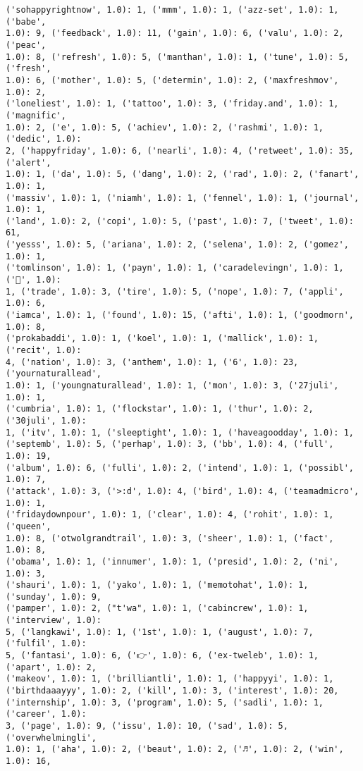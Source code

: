 \documentclass[11pt]{article}
\begin{document}
\begin{Verbatim}[commandchars=\\\{\}]
('sohappyrightnow', 1.0): 1, ('mmm', 1.0): 1, ('azz-set', 1.0): 1, ('babe',
1.0): 9, ('feedback', 1.0): 11, ('gain', 1.0): 6, ('valu', 1.0): 2, ('peac',
1.0): 8, ('refresh', 1.0): 5, ('manthan', 1.0): 1, ('tune', 1.0): 5, ('fresh',
1.0): 6, ('mother', 1.0): 5, ('determin', 1.0): 2, ('maxfreshmov', 1.0): 2,
('loneliest', 1.0): 1, ('tattoo', 1.0): 3, ('friday.and', 1.0): 1, ('magnific',
1.0): 2, ('e', 1.0): 5, ('achiev', 1.0): 2, ('rashmi', 1.0): 1, ('dedic', 1.0):
2, ('happyfriday', 1.0): 6, ('nearli', 1.0): 4, ('retweet', 1.0): 35, ('alert',
1.0): 1, ('da', 1.0): 5, ('dang', 1.0): 2, ('rad', 1.0): 2, ('fanart', 1.0): 1,
('massiv', 1.0): 1, ('niamh', 1.0): 1, ('fennel', 1.0): 1, ('journal', 1.0): 1,
('land', 1.0): 2, ('copi', 1.0): 5, ('past', 1.0): 7, ('tweet', 1.0): 61,
('yesss', 1.0): 5, ('ariana', 1.0): 2, ('selena', 1.0): 2, ('gomez', 1.0): 1,
('tomlinson', 1.0): 1, ('payn', 1.0): 1, ('caradelevingn', 1.0): 1, ('🌷', 1.0):
1, ('trade', 1.0): 3, ('tire', 1.0): 5, ('nope', 1.0): 7, ('appli', 1.0): 6,
('iamca', 1.0): 1, ('found', 1.0): 15, ('afti', 1.0): 1, ('goodmorn', 1.0): 8,
('prokabaddi', 1.0): 1, ('koel', 1.0): 1, ('mallick', 1.0): 1, ('recit', 1.0):
4, ('nation', 1.0): 3, ('anthem', 1.0): 1, ('6', 1.0): 23, ('yournaturallead',
1.0): 1, ('youngnaturallead', 1.0): 1, ('mon', 1.0): 3, ('27juli', 1.0): 1,
('cumbria', 1.0): 1, ('flockstar', 1.0): 1, ('thur', 1.0): 2, ('30juli', 1.0):
1, ('itv', 1.0): 1, ('sleeptight', 1.0): 1, ('haveagoodday', 1.0): 1,
('septemb', 1.0): 5, ('perhap', 1.0): 3, ('bb', 1.0): 4, ('full', 1.0): 19,
('album', 1.0): 6, ('fulli', 1.0): 2, ('intend', 1.0): 1, ('possibl', 1.0): 7,
('attack', 1.0): 3, ('>:d', 1.0): 4, ('bird', 1.0): 4, ('teamadmicro', 1.0): 1,
('fridaydownpour', 1.0): 1, ('clear', 1.0): 4, ('rohit', 1.0): 1, ('queen',
1.0): 8, ('otwolgrandtrail', 1.0): 3, ('sheer', 1.0): 1, ('fact', 1.0): 8,
('obama', 1.0): 1, ('innumer', 1.0): 1, ('presid', 1.0): 2, ('ni', 1.0): 3,
('shauri', 1.0): 1, ('yako', 1.0): 1, ('memotohat', 1.0): 1, ('sunday', 1.0): 9,
('pamper', 1.0): 2, ("t'wa", 1.0): 1, ('cabincrew', 1.0): 1, ('interview', 1.0):
5, ('langkawi', 1.0): 1, ('1st', 1.0): 1, ('august', 1.0): 7, ('fulfil', 1.0):
5, ('fantasi', 1.0): 6, ('👉', 1.0): 6, ('ex-tweleb', 1.0): 1, ('apart', 1.0): 2,
('makeov', 1.0): 1, ('brilliantli', 1.0): 1, ('happyyi', 1.0): 1,
('birthdaaayyy', 1.0): 2, ('kill', 1.0): 3, ('interest', 1.0): 20,
('internship', 1.0): 3, ('program', 1.0): 5, ('sadli', 1.0): 1, ('career', 1.0):
3, ('page', 1.0): 9, ('issu', 1.0): 10, ('sad', 1.0): 5, ('overwhelmingli',
1.0): 1, ('aha', 1.0): 2, ('beaut', 1.0): 2, ('♬', 1.0): 2, ('win', 1.0): 16,

\end{Verbatim}
\end{document}
